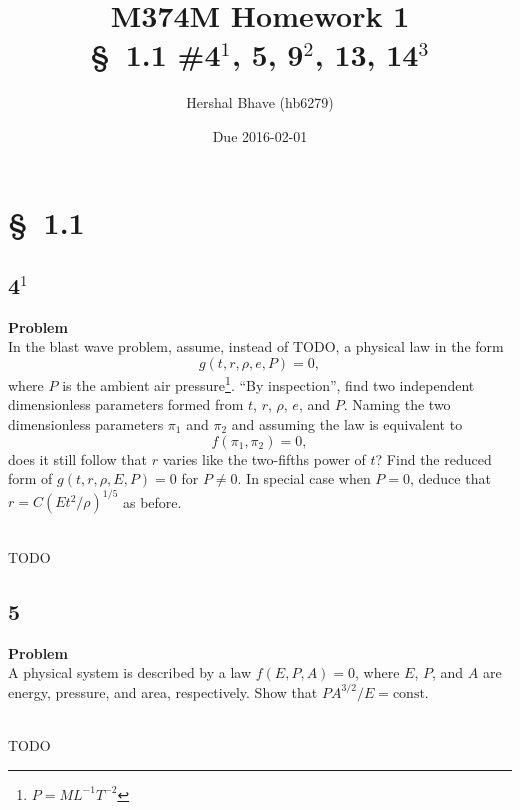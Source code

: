 \documentclass[12pt]{article}
\title{M374M Homework 1 \\
  \normalsize{\S~1.1 \#4$^1$, 5, 9$^2$, 13, 14$^3$}}
\author{Hershal Bhave (hb6279)}
\date{Due 2016-02-01}
\newenvironment{Ex}{\textbf{Problem}\vspace{.75em}\\}{}
\begin{document}
\maketitle

\section{\S~1.1}
\subsection{4$^1$}
\begin{Ex}
  In the blast wave problem, assume, instead of {\color{red}TODO}, a physical law
  in the form
  \begin{equation}
    g(t,r,\rho,e,P)=0,
  \end{equation}
  where $P$ is the ambient air pressure\footnote{$P=M L^{-1} T^{-2}$}. ``By
  inspection'', find two independent dimensionless parameters formed from $t$,
  $r$, $\rho$, $e$, and $P$. Naming the two dimensionless parameters $\pi_1$ and
  $\pi_2$ and assuming the law is equivalent to
  \begin{equation}
    f(\pi_1,\pi_2)=0,
  \end{equation}
  does it still follow that $r$ varies like the two-fifths power of $t$? Find
  the reduced form of $g(t,r,\rho,E,P)=0$ for $P\ne0$. In special case when
  $P=0$, deduce that $r=C(Et^2/\rho)^{1/5}$ as before.
  \begin{solution} \hfill \vspace{.75em} \\
    {\huge \color{red}TODO}
  \end{solution}
\end{Ex}

\subsection{5}
\begin{Ex}
  A physical system is described by a law $f(E,P,A)=0$, where $E$, $P$, and $A$
  are energy, pressure, and area, respectively. Show that $PA^{3/2}/E=\text{const}$.
  \begin{solution} \hfill \vspace{.75em} \\
    {\huge \color{red}TODO}
  \end{solution}
\end{Ex}
\end{document}
